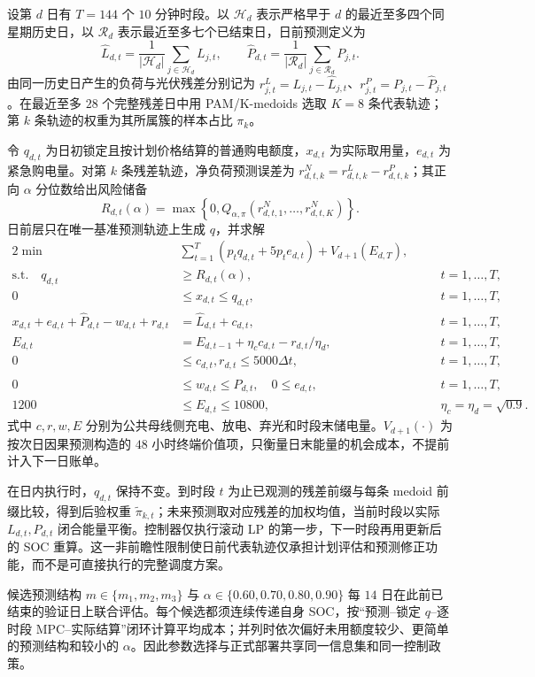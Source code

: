 设第 $d$ 日有 $T=144$ 个 $10$ 分钟时段。以 $\mathcal H_d$ 表示严格早于 $d$ 的最近至多四个同星期历史日，以 $\mathcal R_d$ 表示最近至多七个已结束日，日前预测定义为
\begin{equation}
\widehat L_{d,t}=\frac{1}{|\mathcal H_d|}\sum_{j\in\mathcal H_d}L_{j,t},\qquad
\widehat P_{d,t}=\frac{1}{|\mathcal R_d|}\sum_{j\in\mathcal R_d}P_{j,t}.
\label{eq:q2-forecast}
\end{equation}
由同一历史日产生的负荷与光伏残差分别记为 $r^L_{j,t}=L_{j,t}-\widehat L_{j,t}$、$r^P_{j,t}=P_{j,t}-\widehat P_{j,t}$。在最近至多 $28$ 个完整残差日中用 PAM/K-medoids 选取 $K=8$ 条代表轨迹\cite{pinson}；第 $k$ 条轨迹的权重为其所属簇的样本占比 $\pi_k$。

令 $q_{d,t}$ 为日初锁定且按计划价格结算的普通购电额度，$x_{d,t}$ 为实际取用量，$e_{d,t}$ 为紧急购电量。对第 $k$ 条残差轨迹，净负荷预测误差为 $r^N_{d,t,k}=r^L_{d,t,k}-r^P_{d,t,k}$；其正向 $\alpha$ 分位数给出风险储备
\begin{equation}
R_{d,t}(\alpha)=\max\left\{0,Q_{\alpha,\pi}\left(r^N_{d,t,1},\ldots,r^N_{d,t,K}\right)\right\}.
\label{eq:q2-reserve}
\end{equation}
日前层只在唯一基准预测轨迹上生成 $q$，并求解
\begin{alignat}{2}
\min\quad &\sum_{t=1}^{T}\left(p_tq_{d,t}+5p_te_{d,t}\right)+V_{d+1}(E_{d,T}), &&\label{eq:q2-objective}\\
\text{s.t.}\quad q_{d,t}&\ge R_{d,t}(\alpha), &&\quad t=1,\ldots,T,\nonumber\\[-2pt]
0&\le x_{d,t}\le q_{d,t}, &&\quad t=1,\ldots,T,\nonumber\\[-2pt]
x_{d,t}+e_{d,t}+\widehat P_{d,t}-w_{d,t}+r_{d,t}&=\widehat L_{d,t}+c_{d,t}, &&\quad t=1,\ldots,T,\label{eq:q2-balance}\\
E_{d,t}&=E_{d,t-1}+\eta_cc_{d,t}-r_{d,t}/\eta_d, &&\quad t=1,\ldots,T,\label{eq:q2-soc}\\
0&\le c_{d,t},r_{d,t}\le5000\Delta t, &&\quad t=1,\ldots,T,\nonumber\\[-2pt]
0&\le w_{d,t}\le\widehat P_{d,t},\quad 0\le e_{d,t}, &&\quad t=1,\ldots,T,\nonumber\\[-2pt]
1200&\le E_{d,t}\le10800, &&\quad \eta_c=\eta_d=\sqrt{0.9}.\nonumber
\end{alignat}
式中 $c,r,w,E$ 分别为公共母线侧充电、放电、弃光和时段末储电量。$V_{d+1}(\cdot)$ 为按次日因果预测构造的 $48$ 小时终端价值项，只衡量日末能量的机会成本，不提前计入下一日账单。

在日内执行时，$q_{d,t}$ 保持不变。到时段 $t$ 为止已观测的残差前缀与每条 medoid 前缀比较，得到后验权重 $\widetilde\pi_{k,t}$；未来预测取对应残差的加权均值，当前时段以实际 $L_{d,t},P_{d,t}$ 闭合能量平衡。控制器仅执行滚动 LP 的第一步，下一时段再用更新后的 SOC 重算。这一非前瞻性限制使日前代表轨迹仅承担计划评估和预测修正功能，而不是可直接执行的完整调度方案。

候选预测结构 $m\in\{m_1,m_2,m_3\}$ 与 $\alpha\in\{0.60,0.70,0.80,0.90\}$ 每 $14$ 日在此前已结束的验证日上联合评估。每个候选都须连续传递自身 SOC，按“预测--锁定 $q$--逐时段 MPC--实际结算”闭环计算平均成本；并列时依次偏好未用额度较少、更简单的预测结构和较小的 $\alpha$。因此参数选择与正式部署共享同一信息集和同一控制政策。

